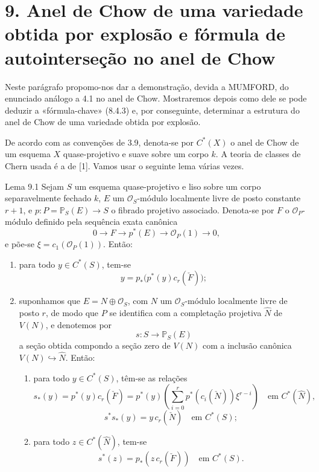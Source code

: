 \section*{9. Anel de Chow de uma variedade obtida por explosão e fórmula de autointerseção no anel de Chow}

Neste parágrafo propomo-nos dar a demonstração, devida a MUMFORD, do enunciado análogo a 4.1 no anel de Chow. Mostraremos depois como dele se pode deduzir a «fórmula-chave» (8.4.3) e, por conseguinte, determinar a estrutura do anel de Chow de uma variedade obtida por explosão.

De acordo com as convenções de 3.9, denota-se por $C^*(X)$ o anel de Chow de um esquema $X$ quase-projetivo e suave sobre um corpo $k$. A teoria de classes de Chern usada é a de [1]. Vamos usar o seguinte lema várias vezes.

\begin{statement}{Lema 9.1}
Sejam $S$ um esquema quase-projetivo e liso sobre um corpo separavelmente fechado $k$, $E$ um $\mathcal O_S$-módulo localmente livre de posto constante $r+1$, e $p:P=\mathbb P_S(E)\to S$ o fibrado projetivo associado. Denota-se por $F$ o $\mathcal O_P$-módulo definido pela sequência exata canônica
\[
0\to F\to p^*(E)\to\mathcal O_P(1)\to0,
\tag{9.1.0}
\]
e põe-se $\xi=c_1(\mathcal O_P(1))$. Então:
\begin{enumerate}[label=(\roman*)]
\item para todo $y\in C^*(S)$, tem-se
\[
y=p_*\bigl(p^*(y)c_r(\check F)\bigr);
\tag{9.1.1}
\]
\item suponhamos que $E=N\oplus\mathcal O_S$, com $N$ um $\mathcal O_S$-módulo localmente livre de posto $r$, de modo que $P$ se identifica com a completação projetiva $\widehat N$ de $V(N)$, e denotemos por
\[
s:S\to\mathbb P_S(E)
\]
a seção obtida compondo a seção zero de $V(N)$ com a inclusão canônica $V(N)\hookrightarrow\widehat N$. Então:
\begin{enumerate}[label=(\alph*)]
\item para todo $y\in C^*(S)$, têm-se as relações
\[
s_*(y)=p^*(y)c_r(\check F)=p^*(y)\left(\sum_{i=0}^r p^*(c_i(\check N))\xi^{r-i}\right)
\quad\text{em }C^*(\widehat N),
\tag{9.1.2}
\]
\[
s^*s_*(y)=y\,c_r(\check N)\quad\text{em }C^*(S);
\tag{9.1.3}
\]
\item para todo $z\in C^*(\widehat N)$, tem-se
\[
s^*(z)=p_*(z\,c_r(\check F))\quad\text{em }C^*(S).
\tag{9.1.4}
\]
\end{enumerate}
\end{enumerate}
\end{statement}
